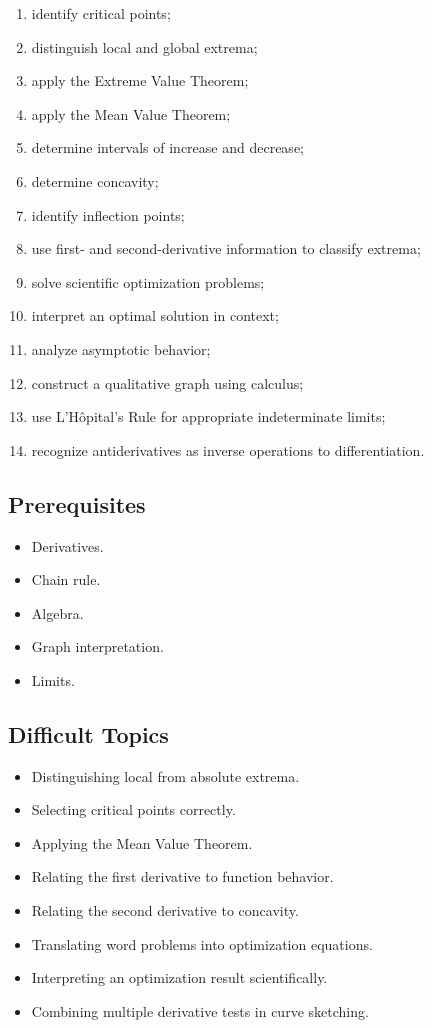 \documentclass[11pt]{article}
\begin{document}
\begin{enumerate}
    \item identify critical points;
    \item distinguish local and global extrema;
    \item apply the Extreme Value Theorem;
    \item apply the Mean Value Theorem;
    \item determine intervals of increase and decrease;
    \item determine concavity;
    \item identify inflection points;
    \item use first- and second-derivative information to classify extrema;
    \item solve scientific optimization problems;
    \item interpret an optimal solution in context;
    \item analyze asymptotic behavior;
    \item construct a qualitative graph using calculus;
    \item use L'H\^opital's Rule for appropriate indeterminate limits;
    \item recognize antiderivatives as inverse operations to differentiation.
\end{enumerate}

\subsection{Prerequisites}

\begin{itemize}
    \item Derivatives.
    \item Chain rule.
    \item Algebra.
    \item Graph interpretation.
    \item Limits.
\end{itemize}

\subsection{Difficult Topics}

\begin{itemize}
    \item Distinguishing local from absolute extrema.
    \item Selecting critical points correctly.
    \item Applying the Mean Value Theorem.
    \item Relating the first derivative to function behavior.
    \item Relating the second derivative to concavity.
    \item Translating word problems into optimization equations.
    \item Interpreting an optimization result scientifically.
    \item Combining multiple derivative tests in curve sketching.
\end{itemize}
\end{document}
